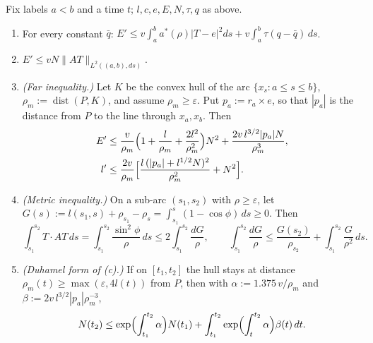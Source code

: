 \begin{lemma}\label{lem:B-3}
Fix labels $a<b$ and a time $t$; $l,c,e,E,N,\tau,q$ as above.
\begin{enumerate}
\item[(a)] For every constant $\bar q$: $E'\le v\int_a^ba^*(\rho)|T-e|^2ds+v\int_a^b\tau(q-\bar q)\,ds$.
\item[(b)] $E'\le vN\|AT\|_{L^2((a,b),ds)}$.
\item[(c)] \emph{(Far inequality.)} Let $K$ be the convex hull of the arc $\{x_s:a\le s\le b\}$, $\rho_m:=\operatorname{dist}(P,K)$,
and assume $\rho_m\ge\varepsilon$. Put $p_a:=r_a\times e$, so that $|p_a|$ is the distance from $P$ to the line through $x_a,x_b$. Then
\begin{align*}
E'&\le\frac v{\rho_m}\Bigl(1+\frac l{\rho_m}+\frac{2l^2}{\rho_m^2}\Bigr)N^2+\frac{2v\,l^{3/2}|p_a|N}{\rho_m^3},\\
l'&\le\frac{2v}{\rho_m}\Bigl[\frac{l\,(|p_a|+l^{1/2}N)^2}{\rho_m^2}+N^2\Bigr].
\end{align*}
\item[(d)] \emph{(Metric inequality.)} On a sub-arc $(s_1,s_2)$ with $\rho\ge\varepsilon$, let
$G(s):=l(s_1,s)+\rho_{s_1}-\rho_s=\int_{s_1}^s(1-\cos\phi)\,ds\ge0$. Then
\[
\int_{s_1}^{s_2}T\cdot AT\,ds=\int_{s_1}^{s_2}\frac{\sin^2\!\phi}\rho\,ds\le2\int_{s_1}^{s_2}\frac{dG}\rho,\qquad
\int_{s_1}^{s_2}\frac{dG}\rho\le\frac{G(s_2)}{\rho_{s_2}}+\int_{s_1}^{s_2}\frac G{\rho^2}\,ds.
\]
\item[(e)] \emph{(Duhamel form of (c).)} If on $[t_1,t_2]$ the hull stays at distance $\rho_m(t)\ge\max(\varepsilon,4l(t))$ from $P$,
then with $\alpha:=1.375\,v/\rho_m$ and $\beta:=2v\,l^{3/2}|p_a|\rho_m^{-3}$,
\[
N(t_2)\le\exp\Bigl(\int_{t_1}^{t_2}\alpha\Bigr)N(t_1)+\int_{t_1}^{t_2}\exp\Bigl(\int_t^{t_2}\alpha\Bigr)\beta(t)\,dt.
\]
\end{enumerate}
\end{lemma}
